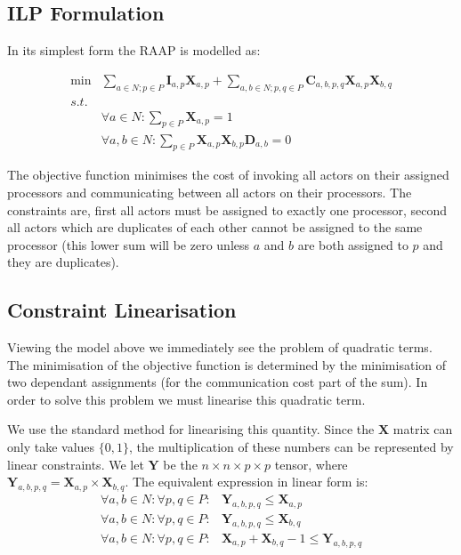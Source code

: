 \subsection{ILP Formulation}

In its simplest form the RAAP is modelled as:

\begin{align}
	\nonumber \min & \sum_{a \in N; p \in P} \mathbf{I}_{a,p}\mathbf{X}_{a,p} + \sum_{a,b \in N; p,q \in P} \mathbf{C}_{a,b,p,q}\mathbf{X}_{a,p}\mathbf{X}_{b,q} \\
	\nonumber s.t. &  \\
	\nonumber & \forall a \in N : \sum_{p \in P}\mathbf{X}_{a,p} = 1 \\
	\nonumber & \forall a,b \in N : \sum_{p \in P}\mathbf{X}_{a,p}\mathbf{X}_{b,p}\mathbf{D}_{a,b} = 0
\end{align}

The objective function minimises the cost of invoking all actors on their assigned processors and communicating between all actors on their processors.
The constraints are, first all actors must be assigned to exactly one processor, second all actors which are duplicates of each other cannot be assigned to the same processor (this lower sum will be zero unless $a$ and $b$ are both assigned to $p$ and they are duplicates).

\subsection{Constraint Linearisation}
\label{secModLin}

Viewing the model above we immediately see the problem of quadratic terms.
The minimisation of the objective function is determined by the minimisation of two dependant assignments (for the communication cost part of the sum).
In order to solve this problem we must linearise this quadratic term.

We use the standard method for linearising this quantity.
Since the $\mathbf{X}$ matrix can only take values $\{0, 1\}$, the multiplication of these numbers can be represented by linear constraints.
We let $\mathbf{Y}$ be the $n \times n \times p \times p$ tensor, where $\mathbf{Y}_{a,b,p,q} = \mathbf{X}_{a,p} \times \mathbf{X}_{b,q}$.
The equivalent expression in linear form is:
\begin{align}
	\nonumber \forall a,b \in N : \forall p,q \in P : & \mathbf{Y}_{a,b,p,q} \leq \mathbf{X}_{a,p} \\
	\nonumber \forall a,b \in N : \forall p,q \in P : & \mathbf{Y}_{a,b,p,q} \leq \mathbf{X}_{b,q} \\
	\nonumber \forall a,b \in N : \forall p,q \in P : & \mathbf{X}_{a,p} + \mathbf{X}_{b,q} - 1 \leq \mathbf{Y}_{a,b,p,q}
\end{align}

